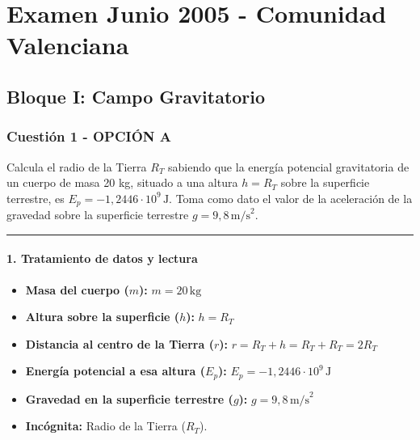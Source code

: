 \chapter{Examen Junio 2005 - Comunidad Valenciana}
\label{chap:2005_jun_cv}

\section{Bloque I: Campo Gravitatorio}
\label{sec:grav_2005_jun_cv}

\subsection{Cuestión 1 - OPCIÓN A}
\label{subsec:1A_2005_jun_cv}

\begin{cajaenunciado}
Calcula el radio de la Tierra $R_T$ sabiendo que la energía potencial gravitatoria de un cuerpo de masa 20 kg, situado a una altura $h=R_T$ sobre la superficie terrestre, es $E_p = -1,2446 \cdot 10^9\,\text{J}$. Toma como dato el valor de la aceleración de la gravedad sobre la superficie terrestre $g=9,8\,\text{m/s}^2$.
\end{cajaenunciado}
\hrule

\subsubsection*{1. Tratamiento de datos y lectura}
\begin{itemize}
    \item \textbf{Masa del cuerpo ($m$):} $m = 20 \, \text{kg}$
    \item \textbf{Altura sobre la superficie ($h$):} $h = R_T$
    \item \textbf{Distancia al centro de la Tierra ($r$):} $r = R_T + h = R_T + R_T = 2R_T$
    \item \textbf{Energía potencial a esa altura ($E_p$):} $E_p = -1,2446 \cdot 10^9 \, \text{J}$
    \item \textbf{Gravedad en la superficie terrestre ($g$):} $g = 9,8 \, \text{m/s}^2$
    \item \textbf{Incógnita:} Radio de la Tierra ($R_T$).
\end{itemize}


